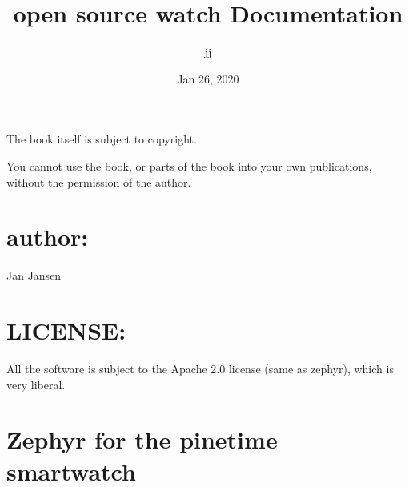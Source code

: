 \documentclass[letterpaper,10pt,english]{sphinxmanual}
\title{open source watch Documentation}
\date{Jan 26, 2020}
\author{jj}
\begin{document}
\pagestyle{empty}
\sphinxmaketitle
\pagestyle{plain}
\sphinxtableofcontents
\pagestyle{normal}
\label{\detokenize{index::doc}}
\noindent{}




The book itself is subject to copyright.

You cannot use the book, or parts of the book into your own publications, without the permission of the author.


\chapter{author:}
\label{\detokenize{copyright:author}}
Jan Jansen


\chapter{LICENSE:}
\label{\detokenize{copyright:license}}
All the software is subject to the Apache 2.0 license (same as zephyr), which is very liberal.


\chapter{Zephyr for the pinetime smartwatch}
\label{\detokenize{content:zephyr-for-the-pinetime-smartwatch}}\label{\detokenize{content::doc}}
\begin{sphinxVerbatim}[commandchars=\\\{\}]
           


           
\end{sphinxVerbatim}
\end{document}
